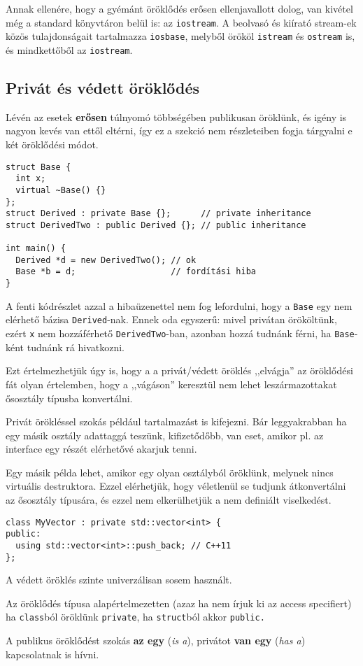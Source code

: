 \documentclass[../cpp_book/cpp_book.tex]{subfiles}
\begin{document}
	Annak ellenére, hogy a gyémánt öröklődés erősen ellenjavallott dolog, van kivétel még a standard könyvtáron belül is: az \texttt{iostream}. A beolvasó és kiírató stream-ek közös tulajdonságait tartalmazza \texttt{iosbase}, melyből örököl \texttt{istream} és \texttt{ostream} is, és mindkettőből az \texttt{iostream}.
	\subsection{Privát és védett öröklődés}
	Lévén az esetek \textbf{erősen} túlnyomó többségében publikusan öröklünk, és igény is nagyon kevés van ettől eltérni, így ez a szekció nem részleteiben fogja tárgyalni e két öröklődési módot.
	\begin{lstlisting}
struct Base {
  int x;
  virtual ~Base() {}
};
struct Derived : private Base {};      // private inheritance
struct DerivedTwo : public Derived {}; // public inheritance

int main() {
  Derived *d = new DerivedTwo(); // ok
  Base *b = d;                   // fordítási hiba
}
	\end{lstlisting}
	A fenti kódrészlet azzal a hibaüzenettel nem fog lefordulni, hogy a \texttt{Base} egy nem elérhető bázisa \texttt{Derived}-nak. Ennek oda egyszerű: mivel privátan örököltünk, ezért \texttt{x} nem hozzáférhető \texttt{DerivedTwo}-ban, azonban hozzá tudnánk férni, ha \texttt{Base}-ként tudnánk rá hivatkozni.
	
	Ezt értelmezhetjük úgy is, hogy a a privát/védett öröklés ,,elvágja'' az öröklődési fát olyan értelemben, hogy a ,,vágáson'' keresztül nem lehet leszármazottakat ősosztály típusba konvertálni.
	\medskip
	
	Privát örökléssel szokás például tartalmazást is kifejezni. Bár leggyakrabban ha egy másik osztály adattaggá teszünk, kifizetődőbb, van eset, amikor pl. az interface egy részét elérhetővé akarjuk tenni.
	
	Egy másik példa lehet, amikor egy olyan osztályból öröklünk, melynek nincs virtuális destruktora. Ezzel elérhetjük, hogy véletlenül se tudjunk átkonvertálni az ősosztály típusára, és ezzel nem elkerülhetjük a nem definiált viselkedést.
	\begin{lstlisting}
class MyVector : private std::vector<int> {
public:
  using std::vector<int>::push_back; // C++11
};
	\end{lstlisting}
	A védett öröklés szinte univerzálisan sosem használt.
	\begin{note}
		Az öröklődés típusa alapértelmezetten (azaz ha nem írjuk ki az access specifiert) ha \texttt{class}ból öröklünk \texttt{private}, ha \texttt{struct}ból akkor \texttt{public.}
	\end{note}
	\begin{note}
		A publikus öröklődést szokás \textbf{az egy} (\textit{is a}), privátot \textbf{van egy} (\textit{has a}) kapcsolatnak is hívni.
	\end{note}
\end{document}
